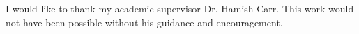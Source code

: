 I would like to thank my academic supervisor Dr. Hamish Carr. This work would not have been possible without his guidance and encouragement.


%
%
%
